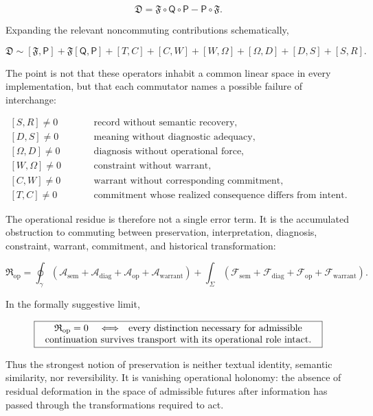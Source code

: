 \documentclass[11pt]{article}
\begin{document}
\[
\mathfrak D
=
\mathfrak F\circ\mathsf Q\circ\mathsf P
-
\mathsf P\circ\mathfrak F.
\]

Expanding the relevant noncommuting contributions schematically,

\[
\mathfrak D
\sim
[\mathfrak F,\mathsf P]
+
\mathfrak F[\mathsf Q,\mathsf P]
+
[T,C]
+
[C,W]
+
[W,\Omega]
+
[\Omega,D]
+
[D,S]
+
[S,R].
\]

The point is not that these operators inhabit a common linear space in every
implementation, but that each commutator names a possible failure of
interchange:

\[
\boxed{
\begin{aligned}
[S,R]\neq0
&\quad &&\text{record without semantic recovery},\\
[D,S]\neq0
&&&\text{meaning without diagnostic adequacy},\\
[\Omega,D]\neq0
&&&\text{diagnosis without operational force},\\
[W,\Omega]\neq0
&&&\text{constraint without warrant},\\
[C,W]\neq0
&&&\text{warrant without corresponding commitment},\\
[T,C]\neq0
&&&\text{commitment whose realized consequence differs from intent}.
\end{aligned}
}
\]

The operational residue is therefore not a single error term. It is the
accumulated obstruction to commuting between preservation, interpretation,
diagnosis, constraint, warrant, commitment, and historical transformation:

\[
\boxed{
\mathfrak R_{\mathrm{op}}
=
\oint_{\gamma}
\left(
\mathcal A_{\mathrm{sem}}
+
\mathcal A_{\mathrm{diag}}
+
\mathcal A_{\mathrm{op}}
+
\mathcal A_{\mathrm{warrant}}
\right)
+
\int_{\Sigma}
\left(
\mathcal F_{\mathrm{sem}}
+
\mathcal F_{\mathrm{diag}}
+
\mathcal F_{\mathrm{op}}
+
\mathcal F_{\mathrm{warrant}}
\right).
}
\]

In the formally suggestive limit,

\[
\boxed{
\parbox{0.85\textwidth}{\centering
$\mathfrak R_{\mathrm{op}}=0$
\quad$\Longleftrightarrow$\quad
every distinction necessary for admissible continuation
survives transport with its operational role intact.}
}
\]

Thus the strongest notion of preservation is neither textual identity,
semantic similarity, nor reversibility. It is vanishing operational holonomy:
the absence of residual deformation in the space of admissible futures after
information has passed through the transformations required to act.
\end{document}
